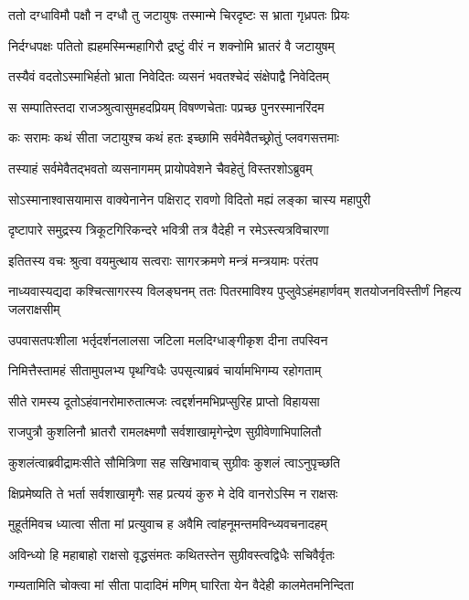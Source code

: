 \twolineshloka
{ततो दग्धाविमौ पक्षौ न दग्धौ तु जटायुषः}
{तस्मान्मे चिरदृष्टः स भ्राता गृध्रपतः प्रियः}


\twolineshloka
{निर्दग्धपक्षः पतितो ह्यहमस्मिन्महागिरौ}
{द्रष्टुं वीरं न शक्नोमि भ्रातरं वै जटायुषम्}


\twolineshloka
{तस्यैवं वदतोऽस्माभिर्हतो भ्राता निवेदितः}
{व्यसनं भवतश्चेदं संक्षेपाद्वै निवेदितम्}


\twolineshloka
{स सम्पातिस्तदा राजञ्श्रुत्वासुमहदप्रियम्}
{विषण्णचेताः पप्रच्छ पुनरस्मानरिंदम}


\twolineshloka
{कः सरामः कथं सीता जटायुश्च कथं हतः}
{इच्छामि सर्वमेवैतच्छ्रोतुं प्लवगसत्तमाः}


\twolineshloka
{तस्याहं सर्वमेवैतद्भवतो व्यसनागमम्}
{प्रायोपवेशने चैवहेतुं विस्तरशोऽब्रुवम्}


\twolineshloka
{सोऽस्मानाश्वासयामास वाक्येनानेन पक्षिराट्}
{रावणो विदितो मह्यं लङ्का चास्य महापुरी}


\twolineshloka
{दृष्टापारे समुद्रस्य त्रिकूटगिरिकन्दरे}
{भवित्री तत्र वैदेही न रमेऽस्त्यत्रविचारणा}


\twolineshloka
{इतितस्य वचः श्रुत्वा वयमुत्थाय सत्वराः}
{सागरक्रमणे मन्त्रं मन्त्रयामः परंतप}


\threelineshloka
{नाध्यवास्यद्यदा कश्चित्सागरस्य विलङ्घनम्}
{ततः पितरमाविश्य पुप्लुवेऽहंमहार्णवम्}
{शतयोजनविस्तीर्णं निहत्य जलराक्षसीम्}


\twolineshloka
{उपवासतपःशीला भर्तृदर्शनलालसा}
{जटिला मलदिग्धाङ्गीकृश दीना तपस्विन}


\twolineshloka
{निमित्तैस्तामहं सीतामुपलभ्य पृथग्विधैः}
{उपसृत्याब्रवं चार्यामभिगम्य रहोगताम्}


\twolineshloka
{सीते रामस्य दूतोऽहंवानरोमारुतात्मजः}
{त्वद्दर्शनमभिप्रप्सुरिह प्राप्तो विहायसा}


\twolineshloka
{राजपुत्रौ कुशलिनौ भ्रातरौ रामलक्ष्मणौ}
{सर्वशाखामृगेन्द्रेण सुग्रीवेणाभिपालितौ}


\twolineshloka
{कुशलंत्वाब्रवीद्रामःसीते सौमित्रिणा सह}
{सखिभावाच् सुग्रीवः कुशलं त्वाऽनुपृच्छति}


\twolineshloka
{क्षिप्रमेष्यति ते भर्ता सर्वशाखामृगैः सह}
{प्रत्ययं कुरु मे देवि वानरोऽस्मि न राक्षसः}


\twolineshloka
{मुहूर्तमिवच ध्यात्वा सीता मां प्रत्युवाच ह}
{अवैमि त्वांहनूमन्तमविन्ध्यवचनादहम्}


\twolineshloka
{अविन्ध्यो हि महाबाहो राक्षसो वृद्धसंमतः}
{कथितस्तेन सुग्रीवस्त्वद्विधैः सचिवैर्वृतः}


\twolineshloka
{गम्यतामिति चोक्त्वा मां सीता पादादिमं मणिम्}
{घारिता येन वैदेही कालमेतमनिन्दिता}


